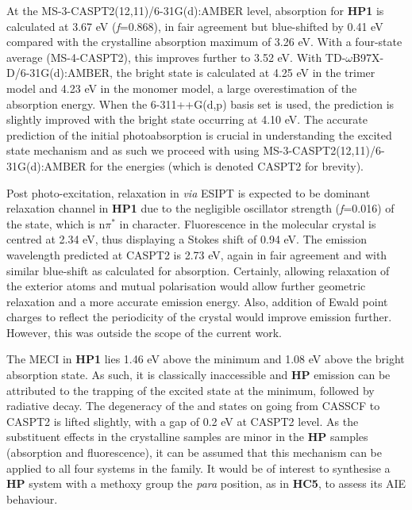 At the MS-3-CASPT2(12,11)/6-31G(d):AMBER level, absorption for \textbf{HP1} is calculated at 3.67 eV (\textit{f}=0.868), in fair agreement but blue-shifted by 0.41 eV compared with the crystalline absorption maximum of 3.26 eV.\cite{Tang2016} 
With a four-state average (MS-4-CASPT2), this improves further to 3.52 eV. With TD-$\omega$B97X-D/6-31G(d):AMBER, the bright state is calculated at 4.25 eV in the trimer model and 4.23 eV in the monomer model, a large overestimation of the absorption energy. When the 6-311++G(d,p) basis set is used, the prediction is slightly improved with the bright state occurring at 4.10 eV. The accurate prediction of the initial photoabsorption is crucial in understanding the excited state mechanism and as such we proceed with using MS-3-CASPT2(12,11)/6-31G(d):AMBER for the energies (which is denoted CASPT2 for brevity). %

Post photo-excitation, relaxation in \sone{} \textit{via}  ESIPT is expected to be dominant relaxation channel in \textbf{HP1} due to the negligible oscillator strength (\textit{f}=0.016) of the \stwo{} state, which is n$\pi^\ast{}$ in character. Fluorescence in the molecular crystal is centred at 2.34 eV, thus displaying a Stokes shift of 0.94 eV. The emission wavelength predicted at CASPT2 is 2.73 eV, again in fair agreement and with similar blue-shift as calculated for absorption. Certainly, allowing relaxation of the exterior atoms and mutual polarisation would allow further geometric relaxation and a more accurate emission energy. Also, addition of Ewald point charges to reflect the periodicity of the crystal would improve emission further. However, this was outside the scope of the current work.

The MECI in \textbf{HP1} lies 1.46 eV above the \Kstar{} minimum and 1.08 eV above the bright absorption state. As such, it is classically inaccessible and \textbf{HP} emission can be attributed to the trapping of the excited state at the \Kstar{} minimum, followed by radiative decay. The degeneracy of the \sone{} and \szero{} states on going from CASSCF to CASPT2 is lifted slightly, with a gap of 0.2 eV at CASPT2 level. As the substituent effects in the crystalline samples are minor in the \textbf{HP} samples (absorption and fluorescence), it can be assumed that this mechanism can be applied to all four systems in the family. It would be of interest to synthesise a \textbf{HP} system with a methoxy group the \textit{para} position, as in \textbf{HC5}, to assess its AIE behaviour.

